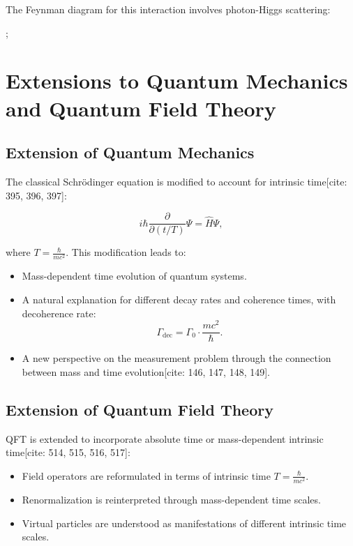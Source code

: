 \documentclass[a4paper,12pt]{article}
\theoremstyle{definition}
\theoremstyle{remark}
\begin{document}
	The Feynman diagram for this interaction involves photon-Higgs scattering:
	
	\begin{center}
		;
	\end{center}
	
	\section{Extensions to Quantum Mechanics and Quantum Field Theory}
	
	\subsection{Extension of Quantum Mechanics}
	
	The classical Schrödinger equation is modified to account for intrinsic time[cite: 395, 396, 397]:
	
	\begin{equation}
		i\hbar \frac{\partial}{\partial (t/T)} \Psi = \hat{H} \Psi,
	\end{equation}
	
	where \( T = \frac{\hbar}{m c^2} \). This modification leads to:
	
	\begin{itemize}
		\item Mass-dependent time evolution of quantum systems.
		\item A natural explanation for different decay rates and coherence times, with decoherence rate:
		\begin{equation}
			\Gamma_{\text{dec}} = \Gamma_0 \cdot \frac{m c^2}{\hbar}.
		\end{equation}
		\item A new perspective on the measurement problem through the connection between mass and time evolution[cite: 146, 147, 148, 149].
	\end{itemize}
	
	\subsection{Extension of Quantum Field Theory}
	
	QFT is extended to incorporate absolute time or mass-dependent intrinsic time[cite: 514, 515, 516, 517]:
	
	\begin{itemize}
		\item Field operators are reformulated in terms of intrinsic time \( T = \frac{\hbar}{m c^2} \).
		\item Renormalization is reinterpreted through mass-dependent time scales.
		\item Virtual particles are understood as manifestations of different intrinsic time scales.
	\end{itemize}
	
\end{document}
